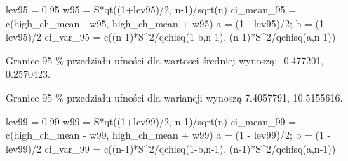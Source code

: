 \documentclass[
]{article}
\newenvironment{Shaded}{\begin{snugshade}}{\end{snugshade}}
\newcommand{\DecValTok}[1]{\textcolor[rgb]{0.00,0.00,0.81}{#1}}
\newcommand{\FloatTok}[1]{\textcolor[rgb]{0.00,0.00,0.81}{#1}}
\newcommand{\FunctionTok}[1]{\textcolor[rgb]{0.00,0.00,0.00}{#1}}
\newcommand{\NormalTok}[1]{#1}
\newcommand{\OtherTok}[1]{\textcolor[rgb]{0.56,0.35,0.01}{#1}}
\newcommand{\SpecialCharTok}[1]{\textcolor[rgb]{0.00,0.00,0.00}{#1}}
\begin{document}
\begin{Shaded}
\begin{Highlighting}[]
\NormalTok{lev95 }\OtherTok{=} \FloatTok{0.95}
\NormalTok{w95 }\OtherTok{=}\NormalTok{ S}\SpecialCharTok{*}\FunctionTok{qt}\NormalTok{((}\DecValTok{1}\SpecialCharTok{+}\NormalTok{lev95)}\SpecialCharTok{/}\DecValTok{2}\NormalTok{, n}\DecValTok{{-}1}\NormalTok{)}\SpecialCharTok{/}\FunctionTok{sqrt}\NormalTok{(n)}
\NormalTok{ci\_mean\_95 }\OtherTok{=} \FunctionTok{c}\NormalTok{(high\_ch\_mean }\SpecialCharTok{{-}}\NormalTok{ w95, high\_ch\_mean }\SpecialCharTok{+}\NormalTok{ w95)}
\NormalTok{a }\OtherTok{=}\NormalTok{ (}\DecValTok{1} \SpecialCharTok{{-}}\NormalTok{ lev95)}\SpecialCharTok{/}\DecValTok{2}\NormalTok{; b }\OtherTok{=}\NormalTok{ (}\DecValTok{1} \SpecialCharTok{{-}}\NormalTok{ lev95)}\SpecialCharTok{/}\DecValTok{2}
\NormalTok{ci\_var\_95 }\OtherTok{=} \FunctionTok{c}\NormalTok{((n}\DecValTok{{-}1}\NormalTok{)}\SpecialCharTok{*}\NormalTok{S}\SpecialCharTok{\^{}}\DecValTok{2}\SpecialCharTok{/}\FunctionTok{qchisq}\NormalTok{(}\DecValTok{1}\SpecialCharTok{{-}}\NormalTok{b,n}\DecValTok{{-}1}\NormalTok{), (n}\DecValTok{{-}1}\NormalTok{)}\SpecialCharTok{*}\NormalTok{S}\SpecialCharTok{\^{}}\DecValTok{2}\SpecialCharTok{/}\FunctionTok{qchisq}\NormalTok{(a,n}\DecValTok{{-}1}\NormalTok{))}
\end{Highlighting}
\end{Shaded}

Granice 95 \% przedziału ufności dla wartosci średniej wynoszą:
-0.477201, 0.2570423.

Granice 95 \% przedziału ufności dla wariancji wynoszą 7.4057791,
10.5155616.

\begin{Shaded}
\begin{Highlighting}[]
\NormalTok{lev99 }\OtherTok{=} \FloatTok{0.99}
\NormalTok{w99 }\OtherTok{=}\NormalTok{ S}\SpecialCharTok{*}\FunctionTok{qt}\NormalTok{((}\DecValTok{1}\SpecialCharTok{+}\NormalTok{lev99)}\SpecialCharTok{/}\DecValTok{2}\NormalTok{, n}\DecValTok{{-}1}\NormalTok{)}\SpecialCharTok{/}\FunctionTok{sqrt}\NormalTok{(n)}
\NormalTok{ci\_mean\_99 }\OtherTok{=} \FunctionTok{c}\NormalTok{(high\_ch\_mean }\SpecialCharTok{{-}}\NormalTok{ w99, high\_ch\_mean }\SpecialCharTok{+}\NormalTok{ w99)}
\NormalTok{a }\OtherTok{=}\NormalTok{ (}\DecValTok{1} \SpecialCharTok{{-}}\NormalTok{ lev99)}\SpecialCharTok{/}\DecValTok{2}\NormalTok{; b }\OtherTok{=}\NormalTok{ (}\DecValTok{1} \SpecialCharTok{{-}}\NormalTok{ lev99)}\SpecialCharTok{/}\DecValTok{2}
\NormalTok{ci\_var\_99 }\OtherTok{=} \FunctionTok{c}\NormalTok{((n}\DecValTok{{-}1}\NormalTok{)}\SpecialCharTok{*}\NormalTok{S}\SpecialCharTok{\^{}}\DecValTok{2}\SpecialCharTok{/}\FunctionTok{qchisq}\NormalTok{(}\DecValTok{1}\SpecialCharTok{{-}}\NormalTok{b,n}\DecValTok{{-}1}\NormalTok{), (n}\DecValTok{{-}1}\NormalTok{)}\SpecialCharTok{*}\NormalTok{S}\SpecialCharTok{\^{}}\DecValTok{2}\SpecialCharTok{/}\FunctionTok{qchisq}\NormalTok{(a,n}\DecValTok{{-}1}\NormalTok{))}
\end{Highlighting}
\end{Shaded}
\end{document}
